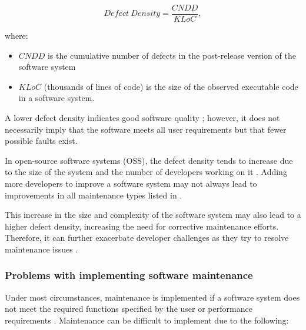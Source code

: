 \begin{equation}
	\label{eq:ch1_defectDensity}
	Defect~Density = \frac{CNDD}{KLoC},
\end{equation}

where:

\begin{itemize}
	\item $CNDD$ is the cumulative number of defects in the post-release version of the software system
	\item $KLoC$ (thousands of lines of code) is the size of the observed executable code in a software system. 
\end{itemize}

A lower defect density indicates good software quality \cite{Shah2012, Alenezi2016}; however, it does not necessarily imply that the software meets all user requirements but that fewer possible faults exist.\par In open-source software systems (OSS), the defect density tends to increase due to the size of the system and the number of developers working on it \cite{Rahmani2010}. Adding more developers to improve a software system may not always lead to improvements in all maintenance types listed in .\par This increase in the size and complexity of the software system may also lead to a higher defect density, increasing the need for corrective maintenance efforts. Therefore, it can further exacerbate developer challenges as they try to resolve maintenance issues \cite{Alenezi2016}.

\subsubsection{Problems with implementing software maintenance}\label{sec:ch1_maintenanceProblems}
Under most circumstances, maintenance is implemented if a software system does not meet the required functions specified by the user or performance requirements \cite{Ogheneovo2014, Sneed2004}. Maintenance can be difficult to implement due to the following:

